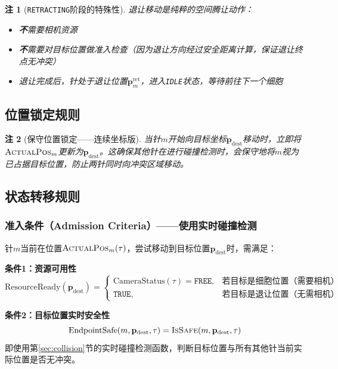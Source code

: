 \documentclass[11pt,a4paper]{article}
\newtheorem{remark}{注}[section]
\begin{document}
\begin{remark}[\texttt{RETRACTING}阶段的特殊性]
退让移动是纯粹的空间腾让动作：
\begin{itemize}
    \item \textbf{不}需要相机资源
    \item \textbf{不}需要对目标位置做准入检查（因为退让方向经过安全距离计算，保证退让终点无冲突）
    \item 退让完成后，针处于退让位置$\mathbf{p}_m^{\text{ret}}$，进入\texttt{IDLE}状态，等待前往下一个细胞
\end{itemize}
\end{remark}

\subsection{位置锁定规则}

\begin{remark}[保守位置锁定——连续坐标版]
当针$m$开始向目标坐标$\mathbf{p}_{\text{dest}}$移动时，立即将$\textsc{ActualPos}_m$更新为$\mathbf{p}_{\text{dest}}$。这确保其他针在进行碰撞检测时，会保守地将$m$视为已占据目标位置，防止两针同时向冲突区域移动。
\end{remark}

\subsection{状态转移规则}

\subsubsection{准入条件（Admission Criteria）——使用实时碰撞检测}

针$m$当前在位置$\textsc{ActualPos}_m(\tau)$，尝试移动到目标位置$\mathbf{p}_{\text{dest}}$时，需满足：

\textbf{条件1：资源可用性}
\begin{equation}
    \text{ResourceReady}(\mathbf{p}_{\text{dest}}) = \begin{cases}
    \text{CameraStatus}(\tau) = \texttt{FREE}, & \text{若目标是细胞位置（需要相机）} \\
    \texttt{TRUE}, & \text{若目标是退让位置（无需相机）}
    \end{cases}
\end{equation}

\textbf{条件2：目标位置实时安全性}
\begin{equation}
    \text{EndpointSafe}(m, \mathbf{p}_{\text{dest}}, \tau) = \textsc{IsSafe}(m, \mathbf{p}_{\text{dest}}, \tau)
\end{equation}
即使用第\ref{sec:collision}节的实时碰撞检测函数，判断目标位置与所有其他针当前实际位置是否无冲突。
\end{document}
